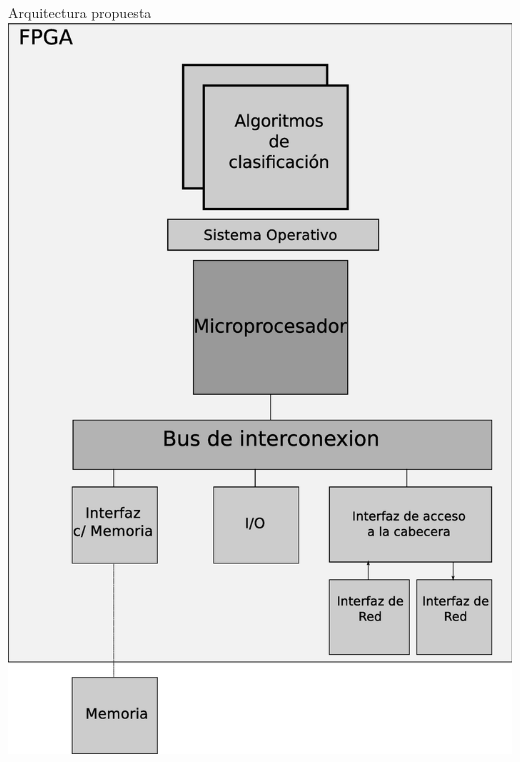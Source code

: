 \documentclass[xcolor=dvipsnames]{beamer}
\begin{document}
\begin{frame}{Arquitectura propuesta}
   \center 
   \includegraphics[scale=0.17]{figures/solucion.eps}
\end{frame}
\end{document}
